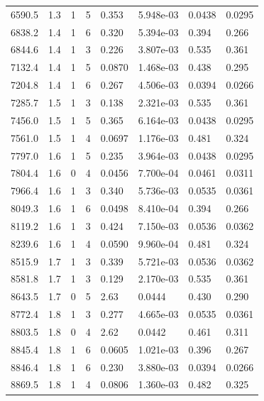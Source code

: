 \documentclass[preview]{standalone}
\begin{document}
{{{\begin{tabular}{L{1.2cm}C{1.2cm} C{0.3cm}C{0.5cm} C{1.4cm}C{1.4cm} C{1.4cm}C{1.4cm}}
  6590.5  &   1.3  & 1     &  5 &  0.353  & 5.948e-03  & 0.0438 &  0.0295   \\ 
  6838.2  &   1.4  & 1     &  6 &  0.320  & 5.394e-03  & 0.394 &  0.266   \\ 
  6844.6  &   1.4  & 1     &  3 &  0.226  & 3.807e-03  & 0.535 &  0.361   \\ 
  7132.4  &   1.4  & 1     &  5 &  0.0870  & 1.468e-03  & 0.438 &  0.295   \\ 
  7204.8  &   1.4  & 1     &  6 &  0.267  & 4.506e-03  & 0.0394 &  0.0266   \\ 
  7285.7  &   1.5  & 1     &  3 &  0.138  & 2.321e-03  & 0.535 &  0.361   \\ 
  7456.0  &   1.5  & 1     &  5 &  0.365  & 6.164e-03  & 0.0438 &  0.0295   \\ 
  7561.0  &   1.5  & 1     &  4 &  0.0697  & 1.176e-03  & 0.481 &  0.324   \\ 
  7797.0  &   1.6  & 1     &  5 &  0.235  & 3.964e-03  & 0.0438 &  0.0295   \\ 
  7804.4  &   1.6  & 0     &  4 &  0.0456  & 7.700e-04  & 0.0461 &  0.0311   \\ 
  7966.4  &   1.6  & 1     &  3 &  0.340  & 5.736e-03  & 0.0535 &  0.0361   \\ 
  8049.3  &   1.6  & 1     &  6 &  0.0498  & 8.410e-04  & 0.394 &  0.266   \\ 
  8119.2  &   1.6  & 1     &  3 &  0.424  & 7.150e-03  & 0.0536 &  0.0362   \\ 
  8239.6  &   1.6  & 1     &  4 &  0.0590  & 9.960e-04  & 0.481 &  0.324   \\ 
  8515.9  &   1.7  & 1     &  3 &  0.339  & 5.721e-03  & 0.0536 &  0.0362   \\ 
  8581.8  &   1.7  & 1     &  3 &  0.129  & 2.170e-03  & 0.535 &  0.361   \\ 
  8643.5  &   1.7  & 0     &  5 &  2.63  & 0.0444  & 0.430 &  0.290   \\ 
  8772.4  &   1.8  & 1     &  3 &  0.277  & 4.665e-03  & 0.0535 &  0.0361   \\ 
  8803.5  &   1.8  & 0     &  4 &  2.62  & 0.0442  & 0.461 &  0.311   \\ 
  8845.4  &   1.8  & 1     &  6 &  0.0605  & 1.021e-03  & 0.396 &  0.267   \\ 
  8846.4  &   1.8  & 1     &  6 &  0.230  & 3.880e-03  & 0.0394 &  0.0266   \\ 
  8869.5  &   1.8  & 1     &  4 &  0.0806  & 1.360e-03  & 0.482 &  0.325   \\ 

\end{tabular}}}}
\end{document}
